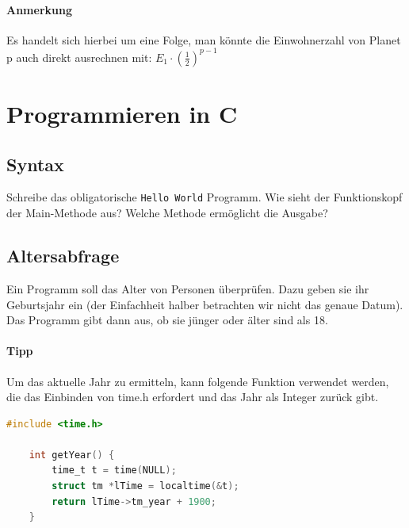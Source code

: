 \documentclass[11pt, a4paper]{article}
\newcommand\braces[1]{\left(#1\right)}
\begin{document}
\paragraph{Anmerkung} Es handelt sich hierbei um eine Folge, man könnte die Einwohnerzahl von Planet p auch direkt ausrechnen mit: $E_1 \cdot \braces{\frac{1}{2}}^{p-1}$


\newpage
\section{Programmieren in C}
\subsection{Syntax}
Schreibe das obligatorische \texttt{Hello World} Programm. Wie sieht der Funktionskopf der Main-Methode aus? Welche Methode ermöglicht die Ausgabe?


\subsection{Altersabfrage}
Ein Programm soll das Alter von Personen überprüfen. Dazu geben sie ihr Geburtsjahr ein (der Einfachheit halber betrachten wir nicht das genaue Datum). Das Programm gibt dann aus, ob sie jünger oder älter sind als 18.

\paragraph{Tipp} Um das aktuelle Jahr zu ermitteln, kann folgende Funktion verwendet werden, die das Einbinden von time.h erfordert und das Jahr als Integer zurück gibt.
\begin{lstlisting}[language=C]
	#include <time.h>

	int getYear() {
		time_t t = time(NULL);
		struct tm *lTime = localtime(&t);
		return lTime->tm_year + 1900;
	}
\end{lstlisting}

\end{document}
